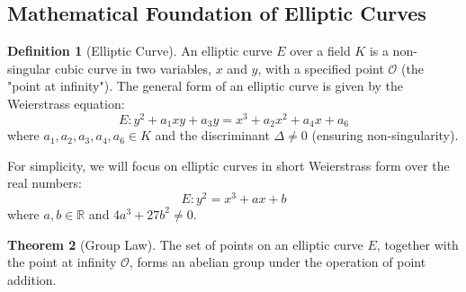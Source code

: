 \documentclass[12pt,a4paper]{article}
\theoremstyle{definition}
\newtheorem{theorem}{Theorem}
\newtheorem{definition}[theorem]{Definition}
\begin{document}
\subsection{Mathematical Foundation of Elliptic Curves}

\begin{definition}[Elliptic Curve]
An elliptic curve $E$ over a field $K$ is a non-singular cubic curve in two variables, $x$ and $y$, with a specified point $\mathcal{O}$ (the "point at infinity"). The general form of an elliptic curve is given by the Weierstrass equation:
\begin{equation}
E: y^2 + a_1xy + a_3y = x^3 + a_2x^2 + a_4x + a_6
\end{equation}
where $a_1, a_2, a_3, a_4, a_6 \in K$ and the discriminant $\Delta \neq 0$ (ensuring non-singularity).
\end{definition}

For simplicity, we will focus on elliptic curves in short Weierstrass form over the real numbers:
\begin{equation}
E: y^2 = x^3 + ax + b
\end{equation}
where $a, b \in \mathbb{R}$ and $4a^3 + 27b^2 \neq 0$.

\begin{theorem}[Group Law]
The set of points on an elliptic curve $E$, together with the point at infinity $\mathcal{O}$, forms an abelian group under the operation of point addition.
\end{theorem}
\end{document}
